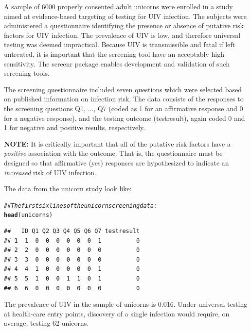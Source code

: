 \documentclass[11pt]{report}\usepackage[]{graphicx}\usepackage[]{xcolor}
\makeatletter
\newcommand{\hlcom}[1]{\textcolor[rgb]{0.678,0.584,0.686}{\textit{#1}}}%
\newcommand{\hlstd}[1]{\textcolor[rgb]{0.345,0.345,0.345}{#1}}%
\newcommand{\hlkwd}[1]{\textcolor[rgb]{0.737,0.353,0.396}{\textbf{#1}}}%
\newenvironment{kframe}{%
 \def\at@end@of@kframe{}%
 \ifinner\ifhmode%
  \def\at@end@of@kframe{\end{minipage}}%
  \begin{minipage}{\columnwidth}%
 \fi\fi%
 \def\FrameCommand##1{\hskip\@totalleftmargin \hskip-\fboxsep
 \colorbox{shadecolor}{##1}\hskip-\fboxsep
     \hskip-\linewidth \hskip-\@totalleftmargin \hskip\columnwidth}%
 \MakeFramed {\advance\hsize-\width
   \@totalleftmargin\z@ \linewidth\hsize
   \@setminipage}}%
 {\par\unskip\endMakeFramed%
 \at@end@of@kframe}
\newenvironment{knitrout}{}{} %
\makeatother
\begin{document}
A sample of 6000 properly consented adult unicorns
were enrolled in a study aimed at evidence-based targeting of testing
for UIV infection.  The subjects were administered a questionnaire
identifying the presence or absence of putative risk factors for UIV
infection.  The prevalence of UIV is low, and therefore universal
testing was deemed impractical. Because UIV is
transmissible and fatal if left untreated, it is important that the
screening tool have an acceptably high sensitivity.  The
\textsf{screenr} package enables development and validation of such
screening tools.

The screening questionnaire included seven questions which were
selected based on published information on infection risk. The data
consists of the responses to the screening questions \textsf{Q1, ..., Q7}
(coded as 1 for an affirmative response and 0 for a negative
response), and the testing outcome (\textsf{testresult}), again coded 0 and 1
for negative and positive results, respectively.

\textbf{NOTE:} It is critically important that all of the putative risk
factors have a \emph{positive} association with the outcome.  That is, the
questionnaire must be designed so that affirmative (yes) responses are
hypothesized to indicate an \emph{increased} risk of UIV infection.

The data from the unicorn study look like:

\begin{knitrout}
\color{fgcolor}\begin{kframe}
\begin{alltt}
\hlcom{## The first six lines of the unicorn screening data:}
\hlkwd{head}\hlstd{(unicorns)}
\end{alltt}
\begin{verbatim}
##   ID Q1 Q2 Q3 Q4 Q5 Q6 Q7 testresult
## 1  1  0  0  0  0  0  0  1          0
## 2  2  0  0  0  0  0  0  0          0
## 3  3  0  0  0  0  0  0  0          0
## 4  4  1  0  0  0  0  0  1          0
## 5  5  1  0  0  1  1  0  1          0
## 6  6  0  0  0  0  0  0  0          0
\end{verbatim}
\end{kframe}
\end{knitrout}


The prevalence of UIV in the sample of unicorns is
0.016. Under universal testing
at health-care entry points, discovery of a single
infection would require, on average, testing
62 unicorns.
\end{document}
